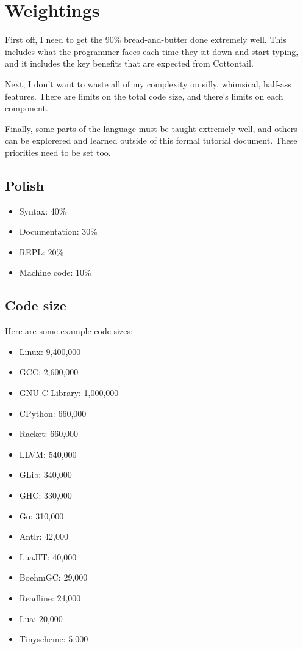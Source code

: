 \chapter{Weightings}

First off, I need to get the 90\% bread-and-butter done extremely
well. This includes what the programmer faces each time they sit down
and start typing, and it includes the key benefits that are expected
from Cottontail.

Next, I don't want to waste all of my complexity on silly, whimsical,
half-ass features. There are limits on the total code size, and
there's limits on each component.

Finally, some parts of the language must be taught extremely well, and
others can be explorered and learned outside of this formal tutorial
document. These priorities need to be set too.


\section{Polish}

\begin{itemize}
\item Syntax:             40\%
\item Documentation:      30\%
\item REPL:               20\%
\item Machine code:       10\%
\end{itemize}


\section{Code size}

Here are some example code sizes:

\begin{itemize}
\item Linux:          9,400,000
\item GCC:            2,600,000
\item GNU C Library:  1,000,000
\item CPython:          660,000
\item Racket:           660,000
\item LLVM:             540,000
\item GLib:             340,000
\item GHC:              330,000
\item Go:               310,000
\item Antlr:             42,000
\item LuaJIT:            40,000
\item BoehmGC:           29,000
\item Readline:          24,000
\item Lua:               20,000
\item Tinyscheme:         5,000
\end{itemize}

